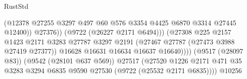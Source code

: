 \begin{lexlean}{RustStd}
\begin{coremodule}
                                                        (@12378
                                                          @27255
                                                          @3297
                                                          @497
                                                          @60
                                                          @576
                                                          @3354
                                                          @4425
                                                          @6870
                                                          @3314
                                                          @27445
                                                          @12400))
                                                      @27376))
                                                  (@9722 (@26227 @2171 @6494)))
                                                (@27308
                                                  @225
                                                  @2157
                                                  @1423
                                                  @2171
                                                  @3283
                                                  @27787
                                                  @3297
                                                  @2191
                                                  (@27467 @27787 (@27473 @3988 @27419 @27377))
                                                  @16628
                                                  @16631
                                                  @16634
                                                  @16637
                                                  @16640))))
                                          (@9517 (@28097 @83))
                                          (@9542 (@28101 @637 @569))
                                          @27517
                                          (@27520
                                            @1226
                                            @2171
                                            @471
                                            @35
                                            @3283
                                            @3294
                                            @6835
                                            @9590
                                            @27530
                                            (@9722 (@25532 @2171 @6835))))
                                        @10256

\end{coremodule}
\end{lexlean}
